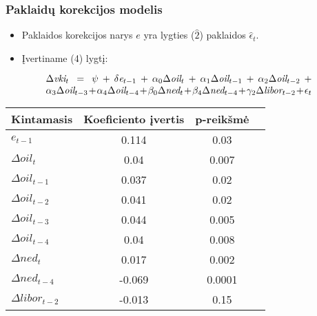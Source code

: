 \documentclass[utf8x,hyperref={unicode}]{beamer}
\begin{document}
\begin{frame}
\frametitle{Paklaidų korekcijos modelis}
\begin{itemize}
\item{Paklaidos korekcijos narys $e$ yra lygties ($\hat{2}$) paklaidos $\hat{\epsilon}_t$.}
\item Įvertiname (4) lygtį:
\end{itemize}
\begin{equation}
\begin{minipage}[b]{0.8\linewidth}
$\Delta\textit{vki}_t = \psi + \delta\textit{e}_{t-1} + \alpha_0\Delta\textit{oil}_t + \alpha_1\Delta\textit{oil}_{t-1} + \alpha_2\Delta\textit{oil}_{t-2} + \alpha_3\Delta\textit{oil}_{t-3} + \alpha_4\Delta\textit{oil}_{t-4} + \beta_0\Delta\textit{ned}_{t} + \beta_4\Delta\textit{ned}_{t-4} + \gamma_2\Delta\textit{libor}_{t-2} + \epsilon_t$
\end{minipage}
\end{equation}

\begin{table}[!h]
\begin{center}
\begin{tabular}{l|ccc} 
\hline
Kintamasis & Koeficiento įvertis & p-reikšmė\\
\hline
$\textit{e}_{t-1}$&0.114&0.03\\
$\Delta\textit{oil}_{t}$&0.04&0.007\\
$\Delta\textit{oil}_{t-1}$&0.037&0.02\\
$\Delta\textit{oil}_{t-2}$&0.041&0.02\\
$\Delta\textit{oil}_{t-3}$&0.044&0.005\\
$\Delta\textit{oil}_{t-4}$&0.04&0.008\\
$\Delta\textit{ned}_{t}$&0.017&0.002\\
$\Delta\textit{ned}_{t-4}$&-0.069&0.0001\\
$\Delta\textit{libor}_{t-2}$&-0.013&0.15\\
\hline
\end{tabular} 
\end{center}
\end{table}
\end{frame}
\end{document}
